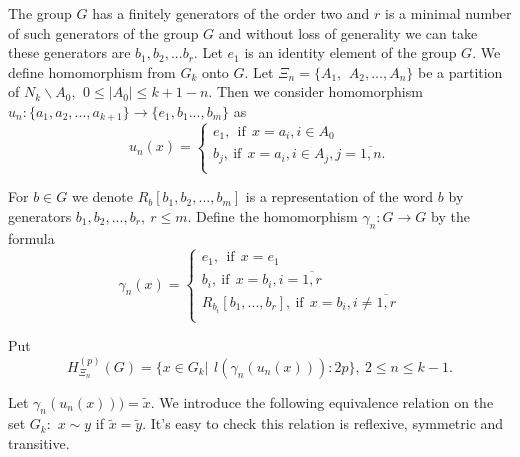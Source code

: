 \documentclass[12pt,reqno]{amsart}
\numberwithin{equation}{section}
\begin{document}
The group $G$ has a finitely generators of the order two and $r$
is a minimal number of such generators of the group $G$ and
without loss of generality we can take these generators are
$b_{1},b_{2},...b_{r}.$ Let $e_{1}$ is an identity element of the
group $G.$ We define homomorphism from $G_{k}$ onto $G.$ Let
$\Xi_{n}=\{A_{1}, \,\ A_{2},...,A_{n}\}$ be a partition of
$N_{k}\backslash A_{0}, \,\ 0\leq|A_{0}|\leq k+1-n.$ Then we
consider homomorphism
$u_{n}:\{a_{1},a_{2},...,a_{k+1}\}\rightarrow \{e_{1},
b_{1}...,b_{m}\}$ as\\
 \begin{equation} u_{n}(x)=\left\{\begin{array}{ll}
e_{1}, \ \ \mbox{if} \ \ x=a_{i}, i\in A_{0}\\[2.5mm]
b_{j}, \ \mbox{if}\ \ x=a_{i}, i\in A_{j}, j=\overline{1,n}.
\\ \end{array}\right.\end{equation}

For $b\in G$ we denote $R_{b}[ b_{1}, b_{2}, ..., b_{m}]$ is a
representation of the word $b$ by generators $b_{1}, b_{2}, ...,
b_{r}, \ r\leq m.$  Define the homomorphism $\gamma_{n}:
G\rightarrow G$ by the formula\\
\begin{equation}\gamma_{n}(x)=\left\{\begin{array}{ll}
e_{1}, \ \ \mbox{if} \ \ x=e_{1}\\[2.5mm]
b_{i}, \ \mbox{if}\ \ x=b_{i}, i=\overline{1,r}\\[2.5mm]
R_{b_{i}}[b_{1},...,b_{r}], \ \mbox{if}\ \ x=b_{i},  i\neq \overline{1,r}\\
\end{array}\right.\end{equation}

Put\\
\begin{equation} H^{(p)}_{\Xi_{n}}(G)=\{x\in G_{k}|\,\
l(\gamma_{n}(u_{n}(x))):2p\},\ 2\leq n \leq k-1. \end{equation}

Let $\gamma_{n}(u_{n}(x)))=\tilde{x}.$ We introduce the following
equivalence relation on the set $G_{k}:$ $x\sim y$ if
$\tilde{x}=\tilde{y}.$ It's easy to check this relation is
reflexive, symmetric and transitive.
\end{document}
